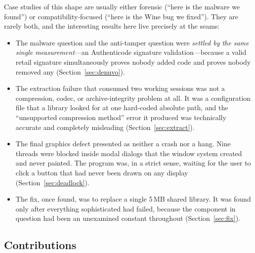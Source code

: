 Case studies of this shape are usually either forensic (``here is the malware
we found'') or compatibility-focused (``here is the Wine bug we fixed''). They
are rarely both, and the interesting results here live precisely at the seams:

\begin{itemize}
\item The malware question and the anti-tamper question were \emph{settled by the
      same single measurement}---an Authenticode signature validation---because a
      valid retail signature simultaneously proves nobody added code and proves
      nobody removed any (Section~\ref{sec:denuvo}).
\item The extraction failure that consumed two working sessions was not a
      compression, codec, or archive-integrity problem at all. It was a
      configuration file that a library looked for at one hard-coded absolute
      path, and the ``unsupported compression method'' error it produced was
      technically accurate and completely misleading (Section~\ref{sec:extract}).
\item The final graphics defect presented as neither a crash nor a hang.
      Nine threads were blocked inside modal dialogs that the window system
      created and never painted. The program was, in a strict sense, waiting for
      the user to click a button that had never been drawn on any display
      (Section~\ref{sec:deadlock}).
\item The fix, once found, was to replace a single 5\,MB shared library. It was
      found only after everything sophisticated had failed, because the component
      in question had been an unexamined constant throughout
      (Section~\ref{sec:fix}).
\end{itemize}

\subsection{Contributions}

